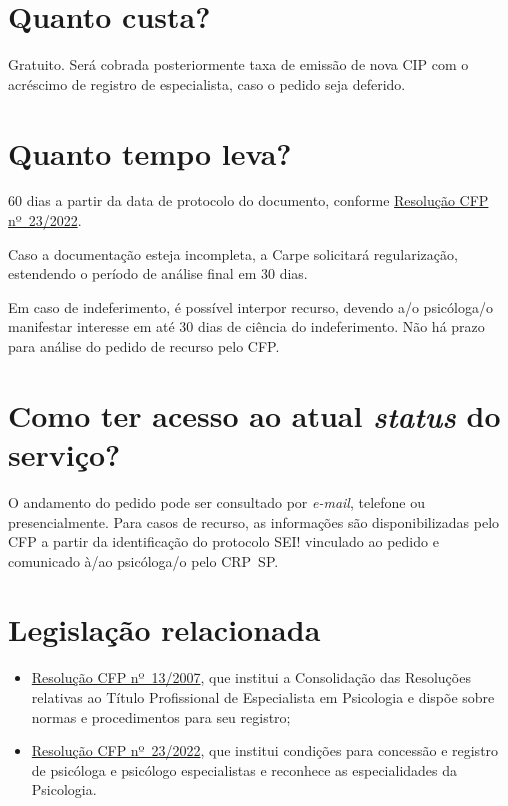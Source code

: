 \section{Quanto custa?}

Gratuito. Será cobrada posteriormente taxa de emissão de nova CIP com o acréscimo de registro de especialista, caso o pedido seja deferido.
\vfill

\section{Quanto tempo leva?}

60 dias a partir da data de protocolo do documento, conforme \href{https://atosoficiais.com.br/cfp/resolucao-do-exercicio-profissional-n-23-2022-institui-condicoes-para-concessao-e-registro-de-psicologa-e-psicologo-especialistas-reconhece-as-especialidades-da-psicologia-e-revoga-as-resolucoes-cfp-n-13-de-14-de-setembro-de-2007-n-3-de-5-de-fevereiro-de-2016-n-18-de-5-de-setembro-de-2019}{Resolução CFP nº~23/2022}.

Caso a documentação esteja incompleta, a Carpe solicitará regularização, estendendo o período de análise final em 30 dias.

Em caso de indeferimento, é possível interpor recurso, devendo a/o psicóloga/o manifestar interesse em até 30 dias de ciência do
indeferimento. Não há prazo para análise do pedido de recurso pelo CFP.
\vfill

\section{Como ter acesso ao atual \emph{status} do serviço?}

O andamento do pedido pode ser consultado por \emph{e-mail}, telefone ou presencialmente. Para casos de recurso, as informações são
disponibilizadas pelo CFP a partir da identificação do protocolo SEI! vinculado ao pedido e comunicado à/ao psicóloga/o pelo CRP~SP.
\vfill\clearpage

\section{Legislação relacionada}

\begin{itemize}
	\item
	\href{https://site.cfp.org.br/wp-content/uploads/2008/08/Resolucao_CFP_nx_013-2007.pdf}{Resolução CFP nº~13/2007}, que institui a Consolidação das Resoluções relativas ao Título Profissional de Especialista em Psicologia e dispõe sobre normas e procedimentos para seu registro;
	\item
	\href{https://atosoficiais.com.br/cfp/resolucao-do-exercicio-profissional-n-23-2022-institui-condicoes-para-concessao-e-registro-de-psicologa-e-psicologo-especialistas-reconhece-as-especialidades-da-psicologia-e-revoga-as-resolucoes-cfp-n-13-de-14-de-setembro-de-2007-n-3-de-5-de-fevereiro-de-2016-n-18-de-5-de-setembro-de-2019}{Resolução CFP nº~23/2022}, que institui condições para concessão e registro de	psicóloga e psicólogo especialistas e reconhece as especialidades da Psicologia.
\end{itemize}


